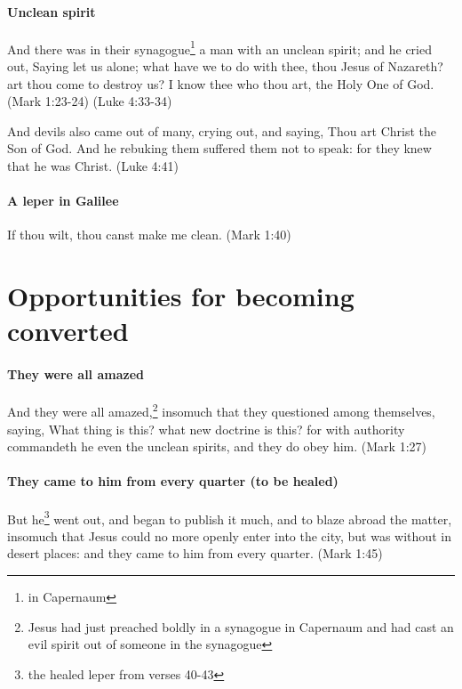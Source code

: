 \paragraph{Unclean spirit}
And there was in their synagogue\footnote{in Capernaum} a man with an unclean spirit; and he cried out, Saying let us alone; what have we to do with thee, thou Jesus of Nazareth? art thou come to destroy us? I know thee who thou art, the Holy One of God. (Mark 1:23-24) (Luke 4:33-34)

And devils also came out of many, crying out, and saying, Thou art Christ the Son of God. And he rebuking them suffered them not to speak: for they knew that he was Christ. (Luke 4:41)

\paragraph{A leper in Galilee}
If thou wilt, thou canst make me clean. (Mark 1:40)

\section{Opportunities for becoming converted}

\paragraph{They were all amazed}
And they were all amazed,\footnote{Jesus had just preached boldly in a synagogue in Capernaum and had cast an evil spirit out of someone in the synagogue} insomuch that they questioned among themselves, saying, What thing is this? what new doctrine is this? for with authority commandeth he even the unclean spirits, and they do obey him. (Mark 1:27)

\paragraph{They came to him from every quarter (to be healed)}
But he\footnote{the healed leper from verses 40-43} went out, and began to publish it much, and to blaze abroad the matter, insomuch that Jesus could no more openly enter into the city, but was without in desert places: and they came to him from every quarter. (Mark 1:45)
